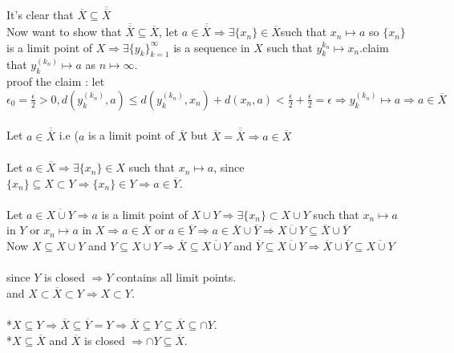 \documentclass{book}
\begin{document}
\begin{tcolorbox}[enhanced,attach boxed title to top center={yshift=-3mm,yshifttext=-1mm},
colback=blue!5!white,colframe=blue!75!black,colbacktitle=red!80!black,
title={Exercise 38.13:},fonttitle=\bfseries,
boxed title style={size=small,colframe=red!50!black}]

{}\\
It's clear that $\overline{X}\subseteq\overline{\overline{X}}$\\
Now want to show that $\overline{\overline{X}}\subseteq\overline{X}$, let 
$a\in\overline{\overline{X}}\Rightarrow\exists\{x_n\}\in \overline{X}$such that $x_n\mapsto a$ so $\{x_n\}$ 
is a limit 
point of $X\Rightarrow\exists\{y_k\}_{k=1}^\infty$ is a sequence in $X$ such that $y_k^{k_n}\mapsto 
x_n$.claim that 
$y_k^{(k_n)}\mapsto a$ as $n\mapsto\infty$.\\
proof the claim : let $\epsilon_0=\frac{\epsilon}{2}>0, d(y_k^{(k_n)},a)\leq 
d(y_k^{(k_n)},x_n)+d(x_n,a)<\frac{\epsilon}{2}+\frac{\epsilon}{2}=\epsilon\Rightarrow y_k^{(k_n)}\mapsto 
a\Rightarrow 
a\in\overline{X}$\\
{}\\
Let $a\in \overline{\overline{X}}$ i.e ($a$ is a limit point of $\overline{X}$
but $\overline{X}=\overline{\overline{X}}\Rightarrow a\in\overline{X}$\\
{}\\
Let $a\in\overline{X}\Rightarrow\exists\{x_n\}\in X$ such that $x_n\mapsto a$, since $\{x_n\}\subseteq 
X\subset Y\Rightarrow\{x_n\}\in Y\Rightarrow a\in \overline{Y}$.\\
{}\\
Let $a\in \overline{X\cup Y}\Rightarrow a$ is a limit point of $X\cup Y\Rightarrow\exists\{x_n\}\subset X\cup 
Y$
such that $x_n\mapsto a$ in $Y$ or $x_n\mapsto a $ in $X\Rightarrow a\in \overline{X}$ or
$a\in \overline{Y}\Rightarrow a\in \overline{X}\cup\overline{Y}\Rightarrow\overline{X\cup 
Y}\subseteq\overline{X}\cup \overline{Y}$\\
Now $X\subseteq X\cup Y$ and $Y\subseteq X\cup Y\Rightarrow\overline{X}\subseteq\overline{X\cup Y}$ and 
$\overline{Y}\subseteq\overline{X\cup Y}\Rightarrow \overline{X}\cup\overline{Y}\subseteq \overline{X\cup 
Y}$\\
{}\\
since $Y$ is closed $\Rightarrow Y$ contains all limit points.\\
and $X\subset\overline{X}\subset Y\Rightarrow X\subset Y$.\\
{}\\
*$X\subseteq Y\Rightarrow \overline{X}\subseteq\overline{Y}=Y\Rightarrow\overline{X}\subseteq Y\subseteq 
\overline{X}\subseteq\cap Y$.\\
*$X\subseteq\overline{X}$ and $\overline{X}$ is closed $\Rightarrow\cap Y\subseteq\overline{X}$.


\end{tcolorbox}
\end{document}
